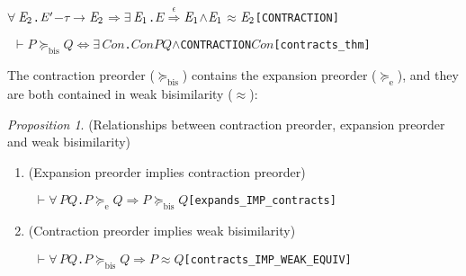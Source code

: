 \documentclass[GCNS]{yincog}
\renewcommand{\HOLConst}[1]{\texttt{#1}}
\renewcommand{\HOLBoundVar}[1]{\ensuremath{\mathit{#1}}}
\renewcommand{\HOLFreeVar}[1]{\ensuremath{\mathit{#1}}}
\renewcommand{\HOLSymConst}[1]{#1}
\renewcommand{\HOLTokenConj}{\ensuremath{\wedge}}
\renewcommand{\HOLTokenEquiv}{\ensuremath{\Longleftrightarrow}}
\renewcommand{\HOLTokenExists}{\ensuremath{\exists \,}}
\renewcommand{\HOLTokenForall}{\ensuremath{\forall \,}}
\renewcommand{\HOLTokenTurnstile}{\ensuremath{\:\:\vdash}}
\theoremstyle{remark}
\theoremstyle{theorem}
\newtheorem{proposition}[definition]{Proposition}
\theoremstyle{remark}
\newcommand{\HOLTokenWeakEQ}{$\approx$}
\newcommand{\HOLTokenEPS}{$\overset{\epsilon}{\Longrightarrow}$}
\newcommand{\HOLTokenTransBegin}{$-$}
\newcommand{\HOLTokenTransEnd}{$\rightarrow$\xspace}
\newcommand{\HOLTokenExpands}{$\succeq_{\mathrm{e}}\!$}
\newcommand{\HOLTokenContracts}{$\succeq_{\mathrm{bis}}\!$}
\renewcommand{\HOLTokenImp}{\ensuremath{\Longrightarrow}}
\newcommand{\wbvtex}{\approx}
\newcommand{\expa}{\mathrel{\succeq_{\mathrm{e}}}}
\newcommand{\mcontrBIS}{\mathrel{\succeq_{\mathrm{bis}}}}
\begin{document}
\begin{alltt}
         \HOLSymConst{\HOLTokenForall{}}\ensuremath{\HOLBoundVar{E}\sb{\mathrm{2}}}. \ensuremath{\HOLBoundVar{E}\sp{\prime}} \HOLTokenTransBegin\HOLSymConst{\ensuremath{\tau}}\HOLTokenTransEnd \ensuremath{\HOLBoundVar{E}\sb{\mathrm{2}}} \HOLSymConst{\HOLTokenImp{}} \HOLSymConst{\HOLTokenExists{}}\ensuremath{\HOLBoundVar{E}\sb{\mathrm{1}}}. \HOLBoundVar{E} \HOLSymConst{\HOLTokenEPS} \ensuremath{\HOLBoundVar{E}\sb{\mathrm{1}}} \HOLSymConst{\HOLTokenConj{}} \ensuremath{\HOLBoundVar{E}\sb{\mathrm{1}}} \HOLSymConst{\HOLTokenWeakEQ} \ensuremath{\HOLBoundVar{E}\sb{\mathrm{2}}}\hfill{[CONTRACTION]}
\end{alltt}

\begin{alltt}
\HOLTokenTurnstile{} \HOLFreeVar{P} \HOLSymConst{\HOLTokenContracts{}} \HOLFreeVar{Q} \HOLSymConst{\HOLTokenEquiv{}} \HOLSymConst{\HOLTokenExists{}}\HOLBoundVar{Con}. \HOLBoundVar{Con} \HOLFreeVar{P} \HOLFreeVar{Q} \HOLSymConst{\HOLTokenConj{}} \HOLConst{CONTRACTION} \HOLBoundVar{Con}\hfill{[contracts\_thm]}
\end{alltt}

The contraction preorder ($\mcontrBIS $) contains the expansion preorder
($\expa $), and they are both contained in weak bisimilarity ($
\wbvtex $):
%
\begin{proposition}%
{(Relationships between contraction preorder, expansion preorder and weak
bisimilarity)}
%
\begin{enumerate}
%
\item (Expansion preorder implies contraction preorder)
%
\begin{alltt}
\HOLTokenTurnstile{} \HOLSymConst{\HOLTokenForall{}}\HOLBoundVar{P} \HOLBoundVar{Q}. \HOLBoundVar{P} \HOLSymConst{\HOLTokenExpands{}} \HOLBoundVar{Q} \HOLSymConst{\HOLTokenImp{}} \HOLBoundVar{P} \HOLSymConst{\HOLTokenContracts{}} \HOLBoundVar{Q}\hfill[expands\_IMP\_contracts]
\end{alltt}
%
\item (Contraction preorder implies weak bisimilarity)
%
\begin{alltt}
\HOLTokenTurnstile{} \HOLSymConst{\HOLTokenForall{}}\HOLBoundVar{P} \HOLBoundVar{Q}. \HOLBoundVar{P} \HOLSymConst{\HOLTokenContracts{}} \HOLBoundVar{Q} \HOLSymConst{\HOLTokenImp{}} \HOLBoundVar{P} \HOLSymConst{\HOLTokenWeakEQ} \HOLBoundVar{Q}\hfill[contracts\_IMP\_WEAK\_EQUIV]
\end{alltt}
%
\end{enumerate}
%
\end{proposition}
\end{document}
